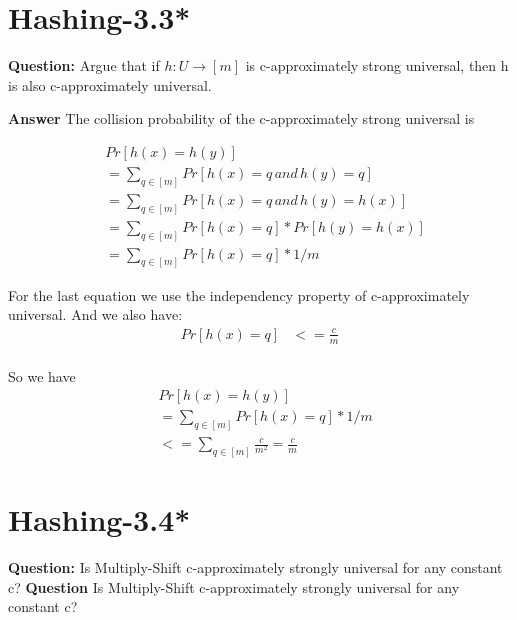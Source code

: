 \documentclass[12pt]{article}
\begin{document}
\section{Hashing-3.3* }
\textbf{Question: }
Argue that if $h: U \rightarrow [m]$ is c-approximately strong universal, then h is also c-approximately universal.

\textbf{Answer}
The collision probability of the c-approximately strong universal is 

\begin{equation}
\begin{aligned}
&Pr[h(x)=h(y)] \\
&= \sum_{q \in [m]} Pr[h(x) = q \, and \, h(y) = q]\\
&= \sum_{q \in [m]} Pr[h(x) = q \, and \, h(y) = h(x)]\\
&=\sum_{q \in [m]} Pr[h(x) = q] * Pr[h(y) = h(x)]\\
&=\sum_{q \in [m]} Pr[h(x) = q] *1/m
\end{aligned}
\end{equation}

For the last equation we use the independency property of c-approximately universal. And we also have:
\begin{equation}
\begin{aligned}
Pr[h(x) = q] &<= \frac{c}{m} \\
\end{aligned}
\end{equation}

So we have
\begin{equation}
\begin{aligned}
&Pr[h(x)=h(y)] \\
&= \sum_{q \in [m]} Pr[h(x) = q] * 1/m\\
&<=\sum_{q \in [m]}   \frac{c}{m^2}
= \frac{c}{m}
\end{aligned}
\end{equation}

\section{Hashing-3.4*}
\textbf{Question:} Is Multiply-Shift c-approximately strongly universal for any constant c?
\textbf{Question} Is Multiply-Shift c-approximately strongly universal for any constant c?
\end{document}
